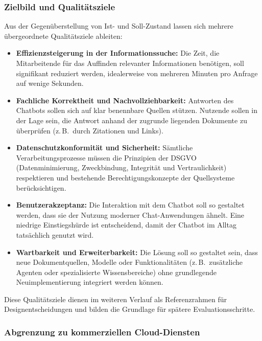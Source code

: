 \subsubsection{Zielbild und Qualitätsziele}\label{subsec:zielbild}

Aus der Gegenüberstellung von Ist- und Soll-Zustand lassen sich mehrere übergeordnete Qualitätsziele ableiten:

\begin{itemize}
    \item \textbf{Effizienzsteigerung in der Informationssuche:}
    Die Zeit, die Mitarbeitende für das Auffinden relevanter Informationen benötigen, soll signifikant reduziert werden, idealerweise von mehreren Minuten pro Anfrage auf wenige Sekunden.

    \item \textbf{Fachliche Korrektheit und Nachvollziehbarkeit:}
    Antworten des Chatbots sollen sich auf klar benennbare Quellen stützen.
    Nutzende sollen in der Lage sein, die Antwort anhand der zugrunde liegenden Dokumente zu überprüfen (z.\,B.\ durch Zitationen und Links).

    \item \textbf{Datenschutzkonformität und Sicherheit:}
    Sämtliche Verarbeitungsprozesse müssen die Prinzipien der DSGVO (Datenminimierung, Zweckbindung, Integrität und Vertraulichkeit) respektieren und bestehende Berechtigungskonzepte der Quellsysteme berücksichtigen.

    \item \textbf{Benutzerakzeptanz:}
    Die Interaktion mit dem Chatbot soll so gestaltet werden, dass sie der Nutzung moderner Chat-Anwendungen ähnelt.
    Eine niedrige Einstiegshürde ist entscheidend, damit der Chatbot im Alltag tatsächlich genutzt wird.

    \item \textbf{Wartbarkeit und Erweiterbarkeit:}
    Die Lösung soll so gestaltet sein, dass neue Dokumentquellen, Modelle oder Funktionalitäten (z.\,B.\ zusätzliche Agenten oder spezialisierte Wissensbereiche) ohne grundlegende Neuimplementierung integriert werden können.
\end{itemize}

Diese Qualitätsziele dienen im weiteren Verlauf als Referenzrahmen für Designentscheidungen und bilden die Grundlage für spätere Evaluationsschritte.

\subsubsection{Abgrenzung zu kommerziellen Cloud-Diensten}\label{subsec:abgrenzung-zu-kommerziellen-cloud-diensten}

